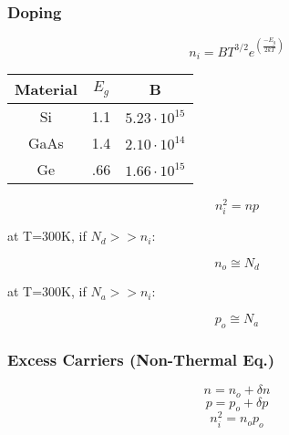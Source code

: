\documentclass[landscape, 12pt]{report}
\begin{document}
\begin{multicols*}{3}
\subsubsection*{Doping}
\begin{equation}
    n_i = BT^{3/2}e^{(\frac{-E_g}{2kT})}
\end{equation}
\begin{center}
\begin{tabular}{c|c|c}
     Material & $E_g$ & B \\
     \hline
     Si& 1.1 & $5.23\cdot10^{15}$\\ 
     GaAs& 1.4 & $2.10\cdot10^{14}$\\ 
     Ge& .66 & $1.66\cdot10^{15}$\\ 
\end{tabular}   
\end{center}
\begin{equation}
     n_i^2 = np
\end{equation}
\begin{center}
    at T=300K, if $N_d >> n_i$:
\end{center}
\begin{equation}
    n_o \cong N_d
\end{equation}
\begin{center}
    at T=300K, if $N_a >> n_i$:
\end{center}
\begin{equation}
    p_o \cong N_a
\end{equation}
\subsubsection*{Excess Carriers (Non-Thermal Eq.)}
\begin{equation}
    n = n_o +\delta n
\end{equation}
\begin{equation}
    p = p_o +\delta p
\end{equation}
\begin{equation}
    n_i^2 = n_op_o
\end{equation}

\end{multicols*}
\end{document}
